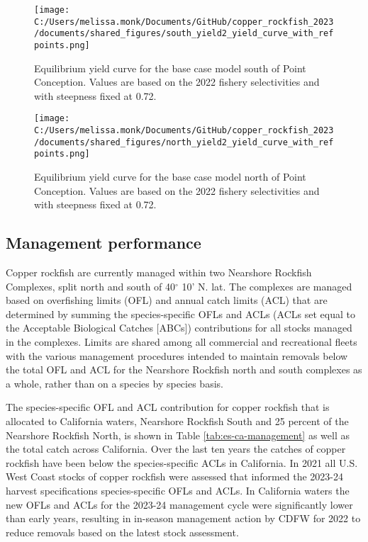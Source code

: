 \documentclass[11pt,
  letterpaper,
]{article}
\begin{document}
\begin{figure}
{\centering
\texttt{[image: C:/Users/melissa.monk/Documents/GitHub/copper\_rockfish\_2023/documents/shared\_figures/south\_yield2\_yield\_curve\_with\_refpoints.png]}
}
\caption{Equilibrium yield curve for the base case model south of Point Conception. Values are based on the 2022
fishery selectivities and with steepness fixed at 0.72.\label{fig:south-es-yield}}
\end{figure}

\begin{figure}
{\centering
\texttt{[image: C:/Users/melissa.monk/Documents/GitHub/copper\_rockfish\_2023/documents/shared\_figures/north\_yield2\_yield\_curve\_with\_refpoints.png]}
}
\caption{Equilibrium yield curve for the base case model north of Point Conception. Values are based on the 2022
fishery selectivities and with steepness fixed at 0.72.\label{fig:north-es-yield}}
\end{figure}

\pagebreak

\subsection*{Management performance}\label{management-performance}

Copper rockfish are currently managed within two Nearshore Rockfish Complexes, split north and south of 40\(^\circ\) 10' N. lat. The complexes are managed based on overfishing limits (OFL) and annual catch limits (ACL) that are determined by summing the species-specific OFLs and ACLs (ACLs set equal to the Acceptable Biological Catches {[}ABCs{]}) contributions for all stocks managed in the complexes. Limits are shared among all commercial and recreational fleets with the various management procedures intended to maintain removals below the total OFL and ACL for the Nearshore Rockfish north and south complexes as a whole, rather than on a species by species basis.

The species-specific OFL and ACL contribution for copper rockfish that is allocated to California waters, Nearshore Rockfish South and 25 percent of the Nearshore Rockfish North, is shown in Table \ref{tab:es-ca-management} as well as the total catch across California. Over the last ten years the catches of copper rockfish have been below the species-specific ACLs in California. In 2021 all U.S. West Coast stocks of copper rockfish were assessed that informed the 2023-24 harvest specifications species-specific OFLs and ACLs. In California waters the new OFLs and ACLs for the 2023-24 management cycle were significantly lower than early years, resulting in in-season management action by CDFW for 2022 to reduce removals based on the latest stock assessment.
\end{document}
